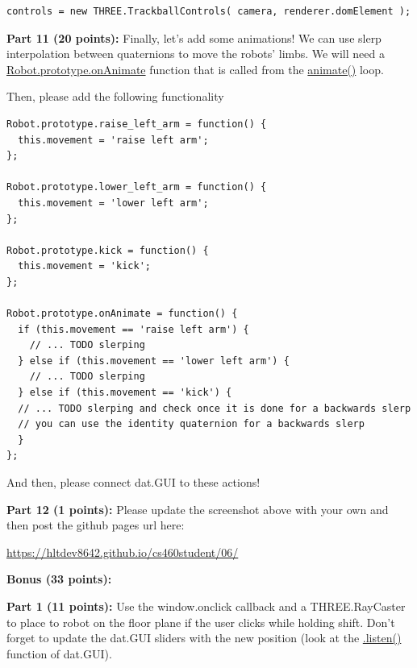 \documentclass[10pt,oneside,onecolumn,letterpaper]{article}
\begin{document}
\begin{verbatim}
controls = new THREE.TrackballControls( camera, renderer.domElement );
\end{verbatim}

\vspace{.5cm}

\noindent\textbf{Part 11 (20 points):} Finally, let's add some animations! We can use slerp interpolation between quaternions to move the robots' limbs. We will need a \url{Robot.prototype.onAnimate} function that is called from the \url{animate()} loop.

\noindent Then, please add the following functionality

\begin{verbatim}
Robot.prototype.raise_left_arm = function() {
  this.movement = 'raise left arm';
};

Robot.prototype.lower_left_arm = function() {
  this.movement = 'lower left arm';
};

Robot.prototype.kick = function() {
  this.movement = 'kick';
};

Robot.prototype.onAnimate = function() {
  if (this.movement == 'raise left arm') {
    // ... TODO slerping
  } else if (this.movement == 'lower left arm') {
    // ... TODO slerping
  } else if (this.movement == 'kick') {
  // ... TODO slerping and check once it is done for a backwards slerp
  // you can use the identity quaternion for a backwards slerp
  }
};
\end{verbatim}

\noindent And then, please connect dat.GUI to these actions!

\vspace{.5cm}

\noindent\textbf{Part 12 (1 points):} Please update the screenshot above with your own and then post the github pages url here:

\vspace{.5cm}

\url{https://hltdev8642.github.io/cs460student/06/}

\vspace{3cm}

\noindent\textbf{Bonus (33 points):}

\vspace{.5cm}

\noindent\textbf{Part 1 (11 points):} Use the window.onclick callback and a THREE.RayCaster to place to robot on the floor plane if the user clicks while holding shift. Don't forget to update the dat.GUI sliders with the new position (look at the \url{.listen()} function of dat.GUI).
\end{document}
